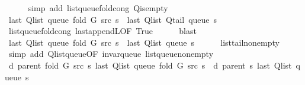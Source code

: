 \begin{isabellebody}
\ \ \ \ \isamarkupfalse%
\ {\isacharparenleft}{\kern0pt}simp\ add{\isacharcolon}{\kern0pt}\ list{\isacharunderscore}{\kern0pt}queue{\isacharunderscore}{\kern0pt}fold{\isacharunderscore}{\kern0pt}cong\ Q{\isachardot}{\kern0pt}is{\isacharunderscore}{\kern0pt}empty{\isacharparenright}{\kern0pt}\isanewline
\isanewline
\ \ \isamarkupfalse%
\ {\isachardoublequoteopen}last\ {\isacharparenleft}{\kern0pt}Q{\isacharunderscore}{\kern0pt}list\ {\isacharparenleft}{\kern0pt}queue\ {\isacharparenleft}{\kern0pt}fold\ G\ src\ s{\isacharparenright}{\kern0pt}{\isacharparenright}{\kern0pt}{\isacharparenright}{\kern0pt}\ {\isacharequal}{\kern0pt}\ last\ {\isacharparenleft}{\kern0pt}Q{\isacharunderscore}{\kern0pt}list\ {\isacharparenleft}{\kern0pt}Q{\isacharunderscore}{\kern0pt}tail\ {\isacharparenleft}{\kern0pt}queue\ s{\isacharparenright}{\kern0pt}{\isacharparenright}{\kern0pt}{\isacharparenright}{\kern0pt}{\isachardoublequoteclose}\isanewline
\ \ \ \ \isamarkupfalse%
\ list{\isacharunderscore}{\kern0pt}queue{\isacharunderscore}{\kern0pt}fold{\isacharunderscore}{\kern0pt}cong\ last{\isacharunderscore}{\kern0pt}appendL{\isacharbrackleft}{\kern0pt}OF\ True{\isacharbrackright}{\kern0pt}\isanewline
\ \ \ \ \isamarkupfalse%
\ blast\isanewline
\ \ \isamarkupfalse%
\ {\isachardoublequoteopen}last\ {\isacharparenleft}{\kern0pt}Q{\isacharunderscore}{\kern0pt}list\ {\isacharparenleft}{\kern0pt}queue\ {\isacharparenleft}{\kern0pt}fold\ G\ src\ s{\isacharparenright}{\kern0pt}{\isacharparenright}{\kern0pt}{\isacharparenright}{\kern0pt}\ {\isacharequal}{\kern0pt}\ last\ {\isacharparenleft}{\kern0pt}Q{\isacharunderscore}{\kern0pt}list\ {\isacharparenleft}{\kern0pt}queue\ s{\isacharparenright}{\kern0pt}{\isacharparenright}{\kern0pt}{\isachardoublequoteclose}\isanewline
\ \ \ \ \isamarkupfalse%
\ list{\isacharunderscore}{\kern0pt}tail{\isacharunderscore}{\kern0pt}non{\isacharunderscore}{\kern0pt}empty\isanewline
\ \ \ \ \isamarkupfalse%
\ {\isacharparenleft}{\kern0pt}simp\ add{\isacharcolon}{\kern0pt}\ Q{\isachardot}{\kern0pt}list{\isacharunderscore}{\kern0pt}queue{\isacharbrackleft}{\kern0pt}OF\ invar{\isacharunderscore}{\kern0pt}queue\ list{\isacharunderscore}{\kern0pt}queue{\isacharunderscore}{\kern0pt}non{\isacharunderscore}{\kern0pt}empty{\isacharbrackright}{\kern0pt}{\isacharparenright}{\kern0pt}\isanewline
\ \ \isamarkupfalse%
\ {\isachardoublequoteopen}d\ {\isacharparenleft}{\kern0pt}parent\ {\isacharparenleft}{\kern0pt}fold\ G\ src\ s{\isacharparenright}{\kern0pt}{\isacharparenright}{\kern0pt}\ {\isacharparenleft}{\kern0pt}last\ {\isacharparenleft}{\kern0pt}Q{\isacharunderscore}{\kern0pt}list\ {\isacharparenleft}{\kern0pt}queue\ {\isacharparenleft}{\kern0pt}fold\ G\ src\ s{\isacharparenright}{\kern0pt}{\isacharparenright}{\kern0pt}{\isacharparenright}{\kern0pt}{\isacharparenright}{\kern0pt}\ {\isacharequal}{\kern0pt}\ d\ {\isacharparenleft}{\kern0pt}parent\ s{\isacharparenright}{\kern0pt}\ {\isacharparenleft}{\kern0pt}last\ {\isacharparenleft}{\kern0pt}Q{\isacharunderscore}{\kern0pt}list\ {\isacharparenleft}{\kern0pt}queue\ s{\isacharparenright}{\kern0pt}{\isacharparenright}{\kern0pt}{\isacharparenright}{\kern0pt}{\isachardoublequoteclose}\isanewline

\end{isabellebody}
